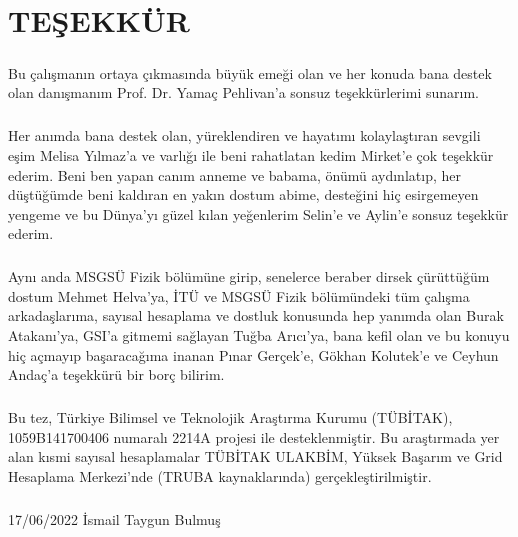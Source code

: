 \chapter{TEŞEKKÜR}

\paragraph{}
Bu çalışmanın ortaya çıkmasında büyük emeği olan ve her konuda bana destek olan danışmanım Prof. Dr. Yamaç Pehlivan'a sonsuz teşekkürlerimi sunarım. 

\paragraph{}
Her anımda bana destek olan, yüreklendiren ve hayatımı kolaylaştıran sevgili eşim Melisa Yılmaz'a ve varlığı ile beni rahatlatan kedim Mirket'e çok teşekkür ederim. Beni ben yapan canım anneme ve babama, önümü aydınlatıp, her düştüğümde beni kaldıran en yakın dostum abime, desteğini hiç esirgemeyen yengeme ve bu Dünya'yı güzel kılan yeğenlerim Selin'e ve Aylin'e sonsuz teşekkür ederim.

\paragraph{}
Aynı anda MSGSÜ Fizik bölümüne girip, senelerce beraber dirsek çürüttüğüm dostum Mehmet Helva'ya, İTÜ ve MSGSÜ Fizik bölümündeki tüm çalışma arkadaşlarıma, sayısal hesaplama ve dostluk konusunda hep yanımda olan Burak Atakanı'ya, GSI'a gitmemi sağlayan Tuğba Arıcı'ya, bana kefil olan ve bu konuyu hiç açmayıp başaracağıma inanan Pınar Gerçek'e, Gökhan Kolutek'e ve Ceyhun Andaç'a teşekkürü bir borç bilirim.

\paragraph{}
Bu tez, Türkiye Bilimsel ve Teknolojik Araştırma Kurumu (TÜBİTAK), \\1059B141700406 numaralı 2214A projesi ile desteklenmiştir. Bu araştırmada yer alan kısmi sayısal hesaplamalar TÜBİTAK ULAKBİM, Yüksek Başarım ve Grid Hesaplama Merkezi’nde (TRUBA kaynaklarında) gerçekleştirilmiştir.
\paragraph{}
17/06/2022 \hfill İsmail Taygun Bulmuş